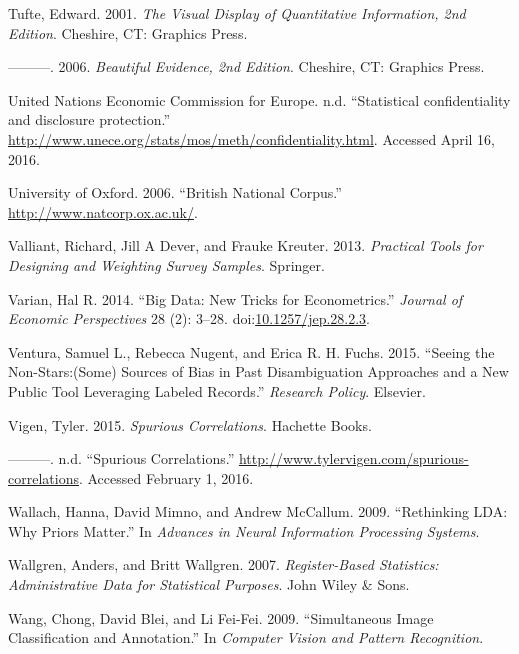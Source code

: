 \documentclass[]{krantz}
\begin{document}
\hypertarget{ref-edward2001visual}{}
Tufte, Edward. 2001. \emph{The Visual Display of Quantitative
Information, 2nd Edition}. Cheshire, CT: Graphics Press.

\hypertarget{ref-edward2006beauty}{}
---------. 2006. \emph{Beautiful Evidence, 2nd Edition}. Cheshire, CT:
Graphics Press.

\hypertarget{ref-UnitedNationsEconomicCommissionforEurope}{}
United Nations Economic Commission for Europe. n.d. ``Statistical
confidentiality and disclosure protection.''
\url{http://www.unece.org/stats/mos/meth/confidentiality.html}. Accessed
April 16, 2016.

\hypertarget{ref-bnc}{}
University of Oxford. 2006. ``British National Corpus.''
\url{http://www.natcorp.ox.ac.uk/}.

\hypertarget{ref-valliant2013practical}{}
Valliant, Richard, Jill A Dever, and Frauke Kreuter. 2013.
\emph{Practical Tools for Designing and Weighting Survey Samples}.
Springer.

\hypertarget{ref-Varian2014}{}
Varian, Hal R. 2014. ``Big Data: New Tricks for Econometrics.''
\emph{Journal of Economic Perspectives} 28 (2): 3--28.
doi:\href{https://doi.org/10.1257/jep.28.2.3}{10.1257/jep.28.2.3}.

\hypertarget{ref-ventura2015seeing}{}
Ventura, Samuel L., Rebecca Nugent, and Erica R. H. Fuchs. 2015.
``Seeing the Non-Stars:(Some) Sources of Bias in Past Disambiguation
Approaches and a New Public Tool Leveraging Labeled Records.''
\emph{Research Policy}. Elsevier.

\hypertarget{ref-spurious2}{}
Vigen, Tyler. 2015. \emph{Spurious Correlations}. Hachette Books.

\hypertarget{ref-spurious}{}
---------. n.d. ``Spurious Correlations.''
\url{http://www.tylervigen.com/spurious-correlations}. Accessed February
1, 2016.

\hypertarget{ref-wallach-09b}{}
Wallach, Hanna, David Mimno, and Andrew McCallum. 2009. ``Rethinking
LDA: Why Priors Matter.'' In \emph{Advances in Neural Information
Processing Systems}.

\hypertarget{ref-wallgren2007register}{}
Wallgren, Anders, and Britt Wallgren. 2007. \emph{Register-Based
Statistics: Administrative Data for Statistical Purposes}. John Wiley \&
Sons.

\hypertarget{ref-wang-09b}{}
Wang, Chong, David Blei, and Li Fei-Fei. 2009. ``Simultaneous Image
Classification and Annotation.'' In \emph{Computer Vision and Pattern
Recognition}.
\end{document}
